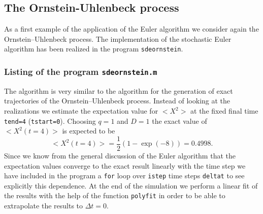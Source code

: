 \subsection{The Ornstein-Uhlenbeck process}
As a first example of the application of the Euler algorithm
we consider again the Ornstein--Uhlenbeck process.
The implementation of the stochastic Euler algorithm has been 
realized in the program \texttt{sdeornstein}.

\subsubsection{Listing of the program \texttt{sdeornstein.m}}

The algorithm is very similar to the algorithm for the generation 
of exact trajectories of the Ornstein--Uhlenbeck process. 
Instead of looking at the realizations we estimate the expectation
value for $<X^2>$ at the fixed final time \texttt{tend=4} 
(\texttt{tstart=0}). Choosing $q=1$ and $D=1$ the exact value of
$<X^2(t=4)>$ is expected to be
\begin{equation*}
<X^2(t=4)> = \frac{1}{2}(1-\exp(-8)) = 0.4998.
\end{equation*}
Since we know from the general discussion of the Euler algorithm
that the expectation values converge to the exact result linearly 
with the time step we have included in the program a \texttt{for}
loop over \texttt{istep} time steps \texttt{deltat} to see explicitly this
dependence. At the end of the simulation we perform a linear fit
of the results with the help of the function \texttt{polyfit} in 
order to be able to extrapolate the results to $\Delta t =0$.

